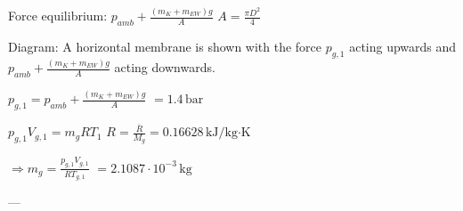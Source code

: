 Force equilibrium:  
\( p_{amb} + \frac{(m_K + m_{EW})g}{A} \)  
\( A = \frac{\pi D^2}{4} \)  

Diagram:  
A horizontal membrane is shown with the force \( p_{g,1} \) acting upwards and \( p_{amb} + \frac{(m_K + m_{EW})g}{A} \) acting downwards.  

\( p_{g,1} = p_{amb} + \frac{(m_K + m_{EW})g}{A} \)  
\( = 1.4 \, \text{bar} \)  

\( p_{g,1} V_{g,1} = m_g R T_1 \)  
\( R = \frac{\overline{R}}{M_g} = 0.16628 \, \text{kJ/kg·K} \)  

\( \Rightarrow m_g = \frac{p_{g,1} V_{g,1}}{R T_{g,1}} \)  
\( = 2.1087 \cdot 10^{-3} \, \text{kg} \)  

---